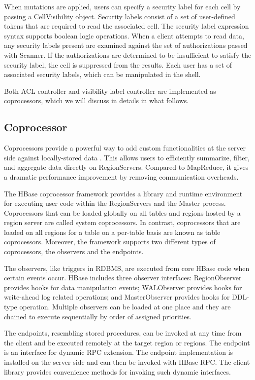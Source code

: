 \documentclass[11pt]{book}
\begin{document}
When mutations are applied, users can specify a security label for each cell by passing a CellVisibility object. Security labels consist of a set of user-defined tokens that are required to read the associated cell. The security label expression syntax supports boolean logic operations. When a client attempts to read data, any security labels present are examined against the set of authorizations passed with Scanner. If the authorizations are determined to be insufficient to satisfy the security label, the cell is suppressed from the results. Each user has a set of associated security labels, which can be manipulated in the shell.

Both ACL controller and visibility label controller are implemented as coprocessors, which we will discuss in details in what follows.

\subsection{Coprocessor}

Coprocessors provide a powerful way to add custom functionalities at the server side against locally-stored data \cite{HBaseCoprocessor}. This allows users to efficiently summarize, filter, and aggregate data directly on RegionServers. Compared to MapReduce, it gives a dramatic performance improvement by removing communication overheads. 

The HBase coprocessor framework provides a library and runtime environment for executing user code within the RegionServers and the Master process. Coprocessors that can be loaded globally on all tables and regions hosted by a region server are called system coprocessors. In contrast, coprocessors that are loaded on all regions for a table on a per-table basis are known as table coprocessors. Moreover, the framework supports two different types of coprocessors, the observers and the endpoints.

The observers, like triggers in RDBMS, are executed from core HBase code when certain events occur. HBase includes three observer interfaces: RegionObserver provides hooks for data manipulation events; WALObserver provides hooks for write-ahead log related operations; and MasterObserver provides hooks for DDL-type operation. Multiple observers can be loaded at one place and they are chained to execute sequentially by order of assigned priorities.

The endpoints, resembling stored procedures, can be invoked at any time from the client and be executed remotely at the target region or regions. The endpoint is an interface for dynamic RPC extension. The endpoint implementation is installed on the server side and can then be invoked with HBase RPC. The client library provides convenience methods for invoking such dynamic interfaces.
\end{document}
